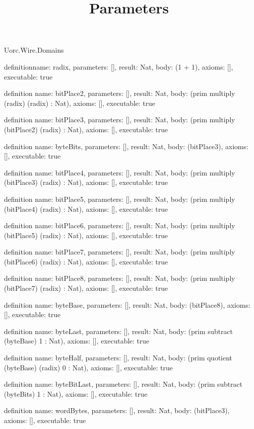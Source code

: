 \begin{lexlean}{Uorc.Wire.Domains}
\title{Parameters}
\begin{semanticmodule}
definition{name: radix, parameters: [], result: Nat, body: (1 + 1), axioms: [], executable: true}

definition{
  name: bitPlace2,
  parameters: [],
  result: Nat,
  body: (prim multiply (radix) (radix) : Nat),
  axioms: [],
  executable: true
}

definition{
  name: bitPlace3,
  parameters: [],
  result: Nat,
  body: (prim multiply (bitPlace2) (radix) : Nat),
  axioms: [],
  executable: true
}

definition{
  name: byteBits,
  parameters: [],
  result: Nat,
  body: (bitPlace3),
  axioms: [],
  executable: true
}

definition{
  name: bitPlace4,
  parameters: [],
  result: Nat,
  body: (prim multiply (bitPlace3) (radix) : Nat),
  axioms: [],
  executable: true
}

definition{
  name: bitPlace5,
  parameters: [],
  result: Nat,
  body: (prim multiply (bitPlace4) (radix) : Nat),
  axioms: [],
  executable: true
}

definition{
  name: bitPlace6,
  parameters: [],
  result: Nat,
  body: (prim multiply (bitPlace5) (radix) : Nat),
  axioms: [],
  executable: true
}

definition{
  name: bitPlace7,
  parameters: [],
  result: Nat,
  body: (prim multiply (bitPlace6) (radix) : Nat),
  axioms: [],
  executable: true
}

definition{
  name: bitPlace8,
  parameters: [],
  result: Nat,
  body: (prim multiply (bitPlace7) (radix) : Nat),
  axioms: [],
  executable: true
}

definition{
  name: byteBase,
  parameters: [],
  result: Nat,
  body: (bitPlace8),
  axioms: [],
  executable: true
}

definition{
  name: byteLast,
  parameters: [],
  result: Nat,
  body: (prim subtract (byteBase) 1 : Nat),
  axioms: [],
  executable: true
}

definition{
  name: byteHalf,
  parameters: [],
  result: Nat,
  body: (prim quotient (byteBase) (radix) 0 : Nat),
  axioms: [],
  executable: true
}

definition{
  name: byteBitLast,
  parameters: [],
  result: Nat,
  body: (prim subtract (byteBits) 1 : Nat),
  axioms: [],
  executable: true
}

definition{
  name: wordBytes,
  parameters: [],
  result: Nat,
  body: (bitPlace3),
  axioms: [],
  executable: true
}


\end{semanticmodule}
\end{lexlean}
